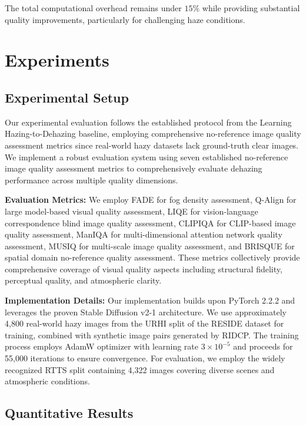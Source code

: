 \documentclass{article}
\begin{document}
The total computational overhead remains under $15\%$ while providing substantial quality improvements, particularly for challenging haze conditions.

\section{Experiments}

\subsection{Experimental Setup}

Our experimental evaluation follows the established protocol from the Learning Hazing-to-Dehazing baseline, employing comprehensive no-reference image quality assessment metrics since real-world hazy datasets lack ground-truth clear images. We implement a robust evaluation system using seven established no-reference image quality assessment metrics to comprehensively evaluate dehazing performance across multiple quality dimensions.

\noindent\textbf{Evaluation Metrics:}
We employ FADE for fog density assessment, Q-Align for large model-based visual quality assessment, LIQE for vision-language correspondence blind image quality assessment, CLIPIQA for CLIP-based image quality assessment, ManIQA for multi-dimensional attention network quality assessment, MUSIQ for multi-scale image quality assessment, and BRISQUE for spatial domain no-reference quality assessment. These metrics collectively provide comprehensive coverage of visual quality aspects including structural fidelity, perceptual quality, and atmospheric clarity.

\noindent\textbf{Implementation Details:}
Our implementation builds upon PyTorch 2.2.2 and leverages the proven Stable Diffusion v2-1 architecture. We use approximately 4,800 real-world hazy images from the URHI split of the RESIDE dataset for training, combined with synthetic image pairs generated by RIDCP. The training process employs AdamW optimizer with learning rate $3 \times 10^{-5}$ and proceeds for 55,000 iterations to ensure convergence. For evaluation, we employ the widely recognized RTTS split containing 4,322 images covering diverse scenes and atmospheric conditions.

\subsection{Quantitative Results}
\end{document}
